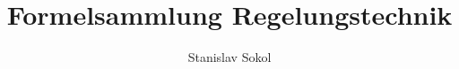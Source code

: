 \documentclass[landscape,fleqn,7pt]{scrartcl}
\author{Stanislav Sokol}
\title{Formelsammlung Regelungstechnik}
\begin{document}
\setlength{\columnsep}{1cm}
\begin{multicols}{3}
    
    
    
    
    
    
    
    
    
    
    
    
    
\end{multicols}
\end{document}
